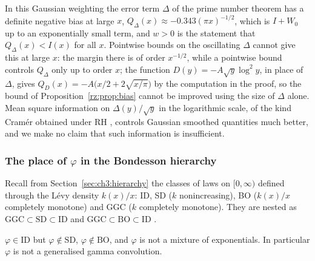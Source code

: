 In this Gaussian weighting the error term $\Delta$ of the prime number theorem has a definite negative bias at large $x$, $Q_\Delta(x)\approx-0.343(\pi x)^{-1/2}$, which is $I+W_0$ up to an exponentially small term, and $w>0$ is the statement that $Q_\Delta(x)<I(x)$ for all $x$. Pointwise bounds on the oscillating $\Delta$ cannot give this at large $x$: the margin there is of order $x^{-1/2}$, while a pointwise bound controls $Q_\Delta$ only up to order $x$; the function $D(y)=-A\sqrt y\log^2y$, in place of $\Delta$, gives $Q_D(x)=-A\bigl(x/2+2\sqrt{x/\pi}\bigr)$ by the computation in the proof, so the bound of Proposition~\ref{rz:prop:bias} cannot be improved using the size of $\Delta$ alone. Mean square information on $\Delta(y)/\sqrt y$ in the logarithmic scale, of the kind Cram\'er obtained under RH \cite{Cramer}, controls Gaussian smoothed quantities much better, and we make no claim that such information is insufficient.

\subsubsection{The place of \texorpdfstring{$\varphi$}{phi} in the Bondesson hierarchy}\label{rz:sec:class}

Recall from Section~\ref{sec:ch3:hierarchy} the classes of laws on $[0,\infty)$ defined through the L\'evy density $k(x)/x$: ID, SD ($k$ nonincreasing), BO ($k(x)/x$ completely monotone) and GGC ($k$ completely monotone). They are nested as $\mathrm{GGC}\subset\mathrm{SD}\subset\mathrm{ID}$ and $\mathrm{GGC}\subset\mathrm{BO}\subset\mathrm{ID}$ \cite{Bondesson,SvH}.

\begin{theorem}\label{rz:thm:class}
$\varphi\in\mathrm{ID}$ but $\varphi\notin\mathrm{SD}$, $\varphi\notin\mathrm{BO}$, and $\varphi$ is not a mixture of exponentials. In particular $\varphi$ is not a generalised gamma convolution.
\end{theorem}

